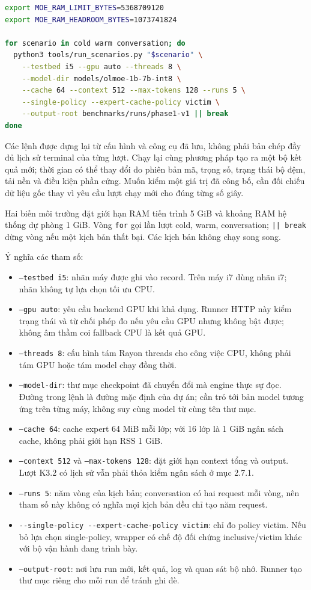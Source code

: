 \begin{lstlisting}[language=bash]
export MOE_RAM_LIMIT_BYTES=5368709120
export MOE_RAM_HEADROOM_BYTES=1073741824

for scenario in cold warm conversation; do
  python3 tools/run_scenarios.py "$scenario" \
    --testbed i5 --gpu auto --threads 8 \
    --model-dir models/olmoe-1b-7b-int8 \
    --cache 64 --context 512 --max-tokens 128 --runs 5 \
    --single-policy --expert-cache-policy victim \
    --output-root benchmarks/runs/phase1-v1 || break
done
\end{lstlisting}

Các lệnh được dựng lại từ cấu hình và công cụ đã lưu, không phải bản chép đầy đủ lịch sử terminal của từng lượt. Chạy lại cùng phương pháp tạo ra một bộ kết quả mới; thời gian có thể thay đổi do phiên bản mã, trọng số, trạng thái bộ đệm, tải nền và điều kiện phần cứng. Muốn kiểm một giá trị đã công bố, cần đối chiếu dữ liệu gốc thay vì yêu cầu lượt chạy mới cho đúng từng số giây.

Hai biến môi trường đặt giới hạn RAM tiến trình 5 GiB và khoảng RAM hệ thống dự phòng 1 GiB. Vòng \texttt{for} gọi lần lượt cold, warm, conversation; \texttt{|| break} dừng vòng nếu một kịch bản thất bại. Các kịch bản không chạy song song.

Ý nghĩa các tham số:

\begin{itemize}
\item \texttt{--testbed i5}: nhãn máy được ghi vào record. Trên máy i7 dùng nhãn i7; nhãn không tự lựa chọn tối ưu CPU.
\item \texttt{--gpu auto}: yêu cầu backend GPU khi khả dụng. Runner HTTP này kiểm trạng thái và từ chối phép đo nếu yêu cầu GPU nhưng không bật được; không âm thầm coi fallback CPU là kết quả GPU.
\item \texttt{--threads 8}: cấu hình tám Rayon threads cho công việc CPU, không phải tám GPU hoặc tám model chạy đồng thời.
\item \texttt{--model-dir}: thư mục checkpoint đã chuyển đổi mà engine thực sự đọc. Đường trong lệnh là đường mặc định của dự án; cần trỏ tới bản model tương ứng trên từng máy, không suy cùng model từ cùng tên thư mục.
\item \texttt{--cache 64}: cache expert 64 MiB mỗi lớp; với 16 lớp là 1 GiB ngân sách cache, không phải giới hạn RSS 1 GiB.
\item \texttt{--context 512} và \texttt{--max-tokens 128}: đặt giới hạn context tổng và output. Lượt K3.2 có lịch sử vẫn phải thỏa kiểm ngân sách ở mục 2.7.1.
\item \texttt{--runs 5}: năm vòng của kịch bản; conversation có hai request mỗi vòng, nên tham số này không có nghĩa mọi kịch bản đều chỉ tạo năm request.
\item \nolinkurl{--single-policy --expert-cache-policy victim}: chỉ đo policy victim. Nếu bỏ lựa chọn single-policy, wrapper có chế độ đối chứng inclusive/victim khác với bộ vận hành đang trình bày.
\item \texttt{--output-root}: nơi lưu run mới, kết quả, log và quan sát bộ nhớ. Runner tạo thư mục riêng cho mỗi run để tránh ghi đè.
\end{itemize}

